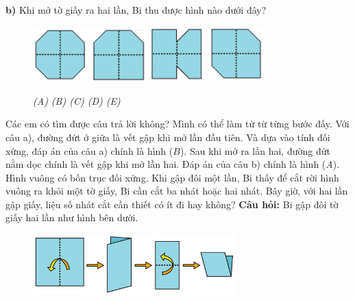 \textbf{b)} Khi mở tờ giấy ra hai lần, Bi thu được hình nào dưới đây?
\begin{figure}[H]
	\centering
	\captionsetup{labelformat=empty}
	\vspace*{-5pt}
	\captionsetup{justification=centering}
	\includegraphics[width =0.19\textwidth]{cat-9a}
	\hfill
	\includegraphics[width =0.19\textwidth]{cat-9b}
	\hfill
	\includegraphics[width =0.19\textwidth]{cat-9c}
	\hfill
	\includegraphics[width =0.19\textwidth]{cat-9d}
	\caption{\small \it (A) \hfill (B) \hfill (C) \hfill (D) \hfill (E)}
\end{figure}
Các em có tìm được câu trả lời không? Mình có thể làm từ từ từng bước đấy. Với câu a), đường đứt ở giữa là vết gập khi mở lần đầu tiên. Và dựa vào tính đối xứng, đáp án của câu a) chính là hình ($B$).
\vskip 0.1cm
Sau khi mở ra lần hai, đường đứt nằm dọc chính là vết gập khi mở lần hai. Đáp án của câu b) chính là hình (\textit{A}).
\vskip 0.1cm
Hình vuông có bốn trục đối xứng. Khi gập đôi một lần, Bi thấy để cắt rời hình vuông ra khỏi một tờ giấy, Bi cần cắt ba nhát hoặc hai nhát. Bây giờ, với hai lần gập giấy, liệu số nhát cắt cần thiết có ít đi hay không?
\vskip 0.1cm
\textbf{Câu hỏi:} Bi gập đôi tờ giấy hai lần như hình bên dưới. 
\begin{figure}[H]
	\captionsetup{labelformat=empty}
	\vspace*{-5pt}
	\centering
	\captionsetup{justification=raggedleft}
	\includegraphics[width =0.7\textwidth]{cat-10}
	\vspace*{-10pt}
\end{figure}
